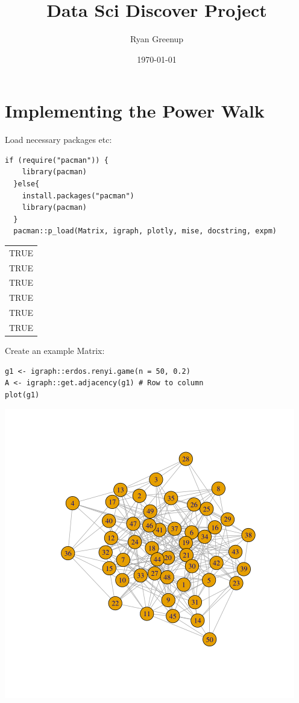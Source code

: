 \documentclass[11pt]{article}
\author{Ryan Greenup}
\date{\today}
\title{Data Sci Discover Project}
\begin{document}
\maketitle
\tableofcontents

\section{Implementing the Power Walk}
\label{sec:org4add4ca}
Load necessary packages etc:

\lstset{language=r,label= ,caption= ,captionpos=b,numbers=none}
\begin{lstlisting}
if (require("pacman")) {
    library(pacman)
  }else{
    install.packages("pacman")
    library(pacman)
  }
  pacman::p_load(Matrix, igraph, plotly, mise, docstring, expm)
\end{lstlisting}

\begin{center}
\begin{tabular}{l}
TRUE\\
TRUE\\
TRUE\\
TRUE\\
TRUE\\
TRUE\\
\end{tabular}
\end{center}

Create an example Matrix:
\lstset{language=r,label= ,caption= ,captionpos=b,numbers=none}
\begin{lstlisting}
g1 <- igraph::erdos.renyi.game(n = 50, 0.2)
A <- igraph::get.adjacency(g1) # Row to column
plot(g1)
\end{lstlisting}

\begin{center}
\includegraphics[width=.9\linewidth]{power-walk-example-graph.png}
\end{center}
\end{document}
